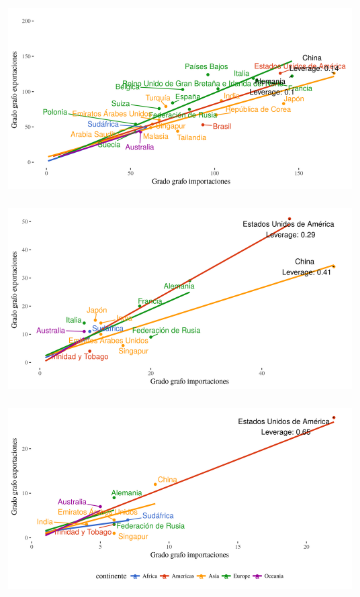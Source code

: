 \documentclass[runningheads,a4paper]{llncs}
\begin{document}
\begin{figure}%
    \begin{subfigure}{\linewidth}
        \centering
        \label{fig:corr-a}%
        \caption{}
        \includegraphics[width=\linewidth]{corr_grados_2011_1_pcnt}
    \end{subfigure}%
    
    \begin{subfigure}{\linewidth}
        \centering
        \label{fig:corr-b}%
        \caption{}
        \includegraphics[width=\linewidth]{corr_grados_2011_10_pcnt}
    \end{subfigure}

    \begin{subfigure}{\linewidth}
        \centering
        \label{fig:corr-c}%
        \caption{}
        \includegraphics[width=\linewidth]{corr_grados_2011_20_pcnt}%
    \end{subfigure}
    \caption[]{}%
    \label{fig:corr}%
\end{figure}
\end{document}
